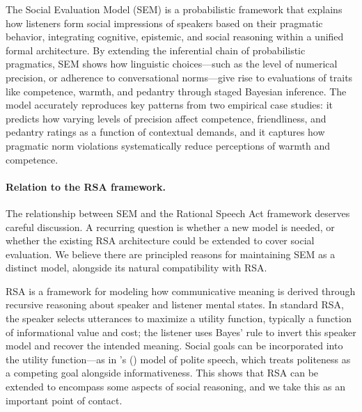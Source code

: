 \documentclass[12pt,a4paper]{article}
\begin{document}
The Social Evaluation Model (SEM) is a probabilistic framework that explains
how listeners form social impressions of speakers based on their pragmatic
behavior, integrating cognitive, epistemic, and social reasoning within a
unified formal architecture. By extending the inferential chain of probabilistic
pragmatics, SEM shows how linguistic choices---such as the level of numerical
precision, or adherence to conversational norms---give rise to evaluations of
traits like competence, warmth, and pedantry through staged Bayesian inference.
The model accurately reproduces key patterns from two empirical case studies: it
predicts how varying levels of precision affect competence, friendliness, and
pedantry ratings as a function of contextual demands, and it captures how
pragmatic norm violations systematically reduce perceptions of warmth and
competence.

\paragraph{Relation to the RSA framework.}
The relationship between SEM and the Rational Speech Act framework
\citep{frank2012,goodman2016} deserves careful discussion. A recurring question
is whether a new model is needed, or whether the existing RSA architecture could
be extended to cover social evaluation. We believe there are principled reasons
for maintaining SEM as a distinct model, alongside its natural compatibility with
RSA.

RSA is a framework for modeling how communicative meaning is derived through
recursive reasoning about speaker and listener mental states. In standard RSA,
the speaker selects utterances to maximize a utility function, typically a
function of informational value and cost; the listener uses Bayes' rule to invert
this speaker model and recover the intended meaning. Social goals can be
incorporated into the utility function---as in \citeauthor{yoontessleretal2020}'s
(\citeyear{yoontessleretal2020}) model of polite speech, which treats politeness
as a competing goal alongside informativeness. This shows that RSA can be
extended to encompass some aspects of social reasoning, and we take this as an
important point of contact.
\end{document}
